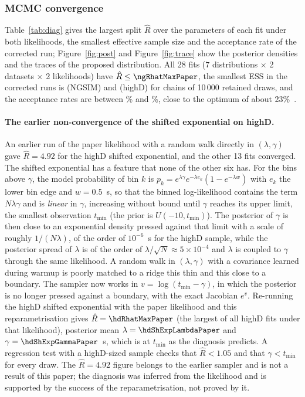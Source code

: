 \documentclass[11pt,a4paper]{article}
\numberwithin{equation}{section}
\begin{document}
\subsubsection{MCMC convergence}\label{sec:conv}
Table~\ref{tab:diag} gives the largest split $\hat R$ over the parameters of each fit under both likelihoods, the smallest effective sample size and the acceptance rate of the corrected run; Figure~\ref{fig:post} and Figure~\ref{fig:trace} show the posterior densities and the traces of the proposed distribution.
All 28 fits ($7$ distributions $\times$ 2 datasets $\times$ 2 likelihoods) have $\hat R\le\ngRhatMaxPaper$, the smallest ESS in the corrected runs is \ngEssMin{} (NGSIM) and \hdEssMin{} (highD) for chains of 10\,000 retained draws, and the acceptance rates are between \ngAccMin\% and \ngAccMax\%, close to the optimum of about 23\%~\cite{roberts1997}.

\paragraph{The earlier non-convergence of the shifted exponential on highD.} An earlier run of the paper likelihood with a random walk directly in $(\lambda,\gamma)$ gave $\hat R=4.92$ for the highD shifted exponential, and the other 13 fits converged. The shifted exponential has a feature that none of the other six has. For the bins above $\gamma$, the model probability of bin $k$ is
$p_k=e^{\lambda\gamma}e^{-\lambda e_k}(1-e^{-\lambda w})$ with $e_k$ the lower bin edge and $w=0.5$~s, so that the binned log-likelihood contains the term $N\lambda\gamma$ and is \emph{linear} in $\gamma$, increasing without bound until $\gamma$
reaches its upper limit, the smallest observation $t_{\min}$ (the prior is $U(-10,t_{\min})$). The posterior of $\gamma$ is then close to an exponential density pressed against that limit with a scale of roughly $1/(N\lambda)$, of the order of $10^{-6}$~s for the highD sample, while
the posterior spread of $\lambda$ is of the order of $\lambda/\sqrt N\approx5\times10^{-4}$ and $\lambda$ is coupled to $\gamma$ through the same likelihood. A random walk in $(\lambda,\gamma)$ with a covariance learned during warmup is poorly matched to a ridge this thin and this close to a boundary.
The sampler now works in $v=\log(t_{\min}-\gamma)$, in which the posterior is no longer pressed against a boundary, with the exact Jacobian $e^{v}$. Re-running the highD shifted exponential with the paper likelihood and this reparametrisation gives $\hat R=\hdRhatMaxPaper$ (the largest of all highD fits under that likelihood), posterior mean $\lambda=\hdShExpLambdaPaper$ and $\gamma=\hdShExpGammaPaper$~s,
which is at $t_{\min}$ as the diagnosis predicts. A regression test with a highD-sized sample checks that $\hat R<1.05$ and that $\gamma<t_{\min}$ for every draw. The $\hat R=4.92$ figure belongs to the earlier sampler and is not a result of this paper; the diagnosis was inferred from the likelihood and is supported by the success of the reparametrisation, not proved by it.
\end{document}
